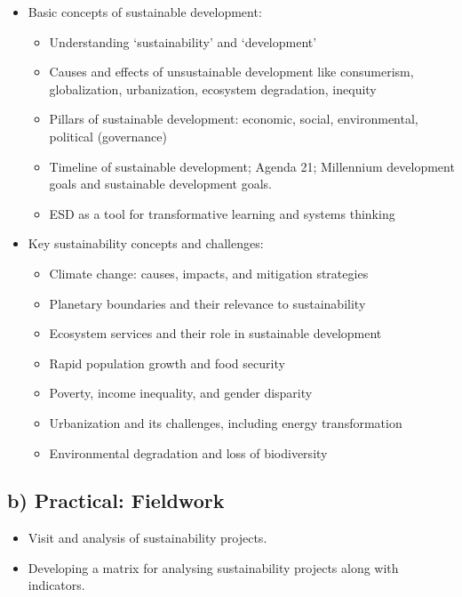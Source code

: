 \documentclass[
  letterpaper,
  10pt,
  openany]{book}
\providecommand{\tightlist}{%
  \setlength{\itemsep}{0pt}\setlength{\parskip}{0pt}}\usepackage{longtable,booktabs,array}
\begin{document}
\begin{itemize}
\tightlist
\item
  Basic concepts of sustainable development:

  \begin{itemize}
  \tightlist
  \item
    Understanding `sustainability' and `development'
  \item
    Causes and effects of unsustainable development like consumerism,
    globalization, urbanization, ecosystem degradation, inequity
  \item
    Pillars of sustainable development: economic, social, environmental,
    political (governance)
  \item
    Timeline of sustainable development; Agenda 21; Millennium
    development goals and sustainable development goals.
  \item
    ESD as a tool for transformative learning and systems thinking
  \end{itemize}
\item
  Key sustainability concepts and challenges:

  \begin{itemize}
  \tightlist
  \item
    Climate change: causes, impacts, and mitigation strategies
  \item
    Planetary boundaries and their relevance to sustainability
  \item
    Ecosystem services and their role in sustainable development
  \item
    Rapid population growth and food security
  \item
    Poverty, income inequality, and gender disparity
  \item
    Urbanization and its challenges, including energy transformation
  \item
    Environmental degradation and loss of biodiversity
  \end{itemize}
\end{itemize}

\subsection*{b) Practical: Fieldwork}\label{b-practical-fieldwork}

\begin{itemize}
\tightlist
\item
  Visit and analysis of sustainability projects.
\item
  Developing a matrix for analysing sustainability projects along with
  indicators.
\end{itemize}
\end{document}
